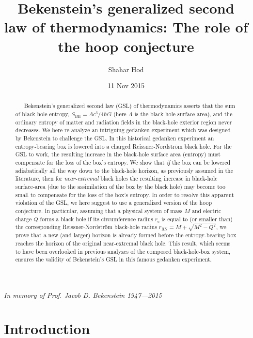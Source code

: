 \documentclass[12pt,preprintnumbers,amsmath,amssymbm,prd]{revtex4-1}
\begin{document}
\title{Bekenstein's generalized second law of thermodynamics: The
role of the hoop conjecture}
\author{Shahar Hod}
\address{The Ruppin Academic Center, Emeq Hefer 40250, Israel}
\address{ }
\address{The Hadassah Institute, Jerusalem 91010, Israel}
\date{11 Nov 2015}
{\it In memory of Prof. Jacob D. Bekenstein 1947---2015}

\begin{abstract}
\ \ \ Bekenstein's generalized second law (GSL) of thermodynamics
asserts that the sum of black-hole entropy,
$S_{\text{BH}}=Ac^3/4\hbar G$ (here $A$ is the black-hole surface
area), and the ordinary entropy of matter and radiation fields in
the black-hole exterior region never decreases. We here re-analyze
an intriguing gedanken experiment which was designed by Bekenstein
to challenge the GSL. In this historical gedanken experiment an
entropy-bearing box is lowered into a charged Reissner-Nordstr\"om
black hole. For the GSL to work, the resulting increase in the
black-hole surface area (entropy) must compensate for the loss of
the box's entropy. We show that {\it if} the box can be lowered
adiabatically all the way down to the black-hole horizon, as
previously assumed in the literature, then for {\it near-extremal}
black holes the resulting increase in black-hole surface-area (due
to the assimilation of the box by the black hole) may become too
small to compensate for the loss of the box's entropy. In order to
resolve this apparent violation of the GSL, we here suggest to use a
generalized version of the hoop conjecture. In particular, assuming
that a physical system of mass $M$ and electric charge $Q$ forms a
black hole if its circumference radius $r_{\text{c}}$ is equal to
(or smaller than) the corresponding Reissner-Nordstr\"om black-hole
radius $r_{\text{RN}}=M+\sqrt{M^2-Q^2}$, we prove that a new (and
larger) horizon is already formed before the entropy-bearing box
reaches the horizon of the original near-extremal black hole. This
result, which seems to have been overlooked in previous analyzes of
the composed black-hole-box system, ensures the validity of
Bekenstein's GSL in this famous gedanken experiment.
\end{abstract}
\bigskip
\maketitle

\section{Introduction}
\end{document}

